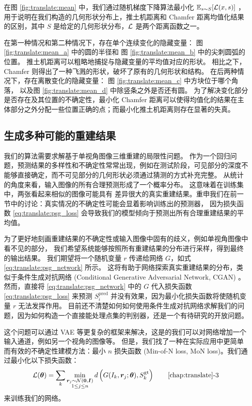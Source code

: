 在图 \ref{fig:translate:mean} 中，我们通过随机梯度下降算法最小化 $\mathbb{E}_{s \sim S} {\left[\mathcal{L}(x, s)\right]}$ ，用于说明在我们构造的几何形状分布上，推土机距离和 Chamfer 距离均值化结果的区别，其中 $S$ 是给定的几何形状分布，$\mathcal{L}$ 是两个距离函数之一。

在第一种情况和第二种情况下，存在单个连续变化的隐藏变量：
图 \ref{fig:translate:mean_a} 中的圆的半径和
图 \ref{fig:translate:mean_b} 中的尖刺圆弧的位置。 推土机距离可以粗略地捕捉与隐藏变量的平均值对应的形状。
相比之下，Chamfer 则得出了一种飞溅的形状，破坏了原有的几何形状和结构。 在后两种情况下，存在离散变化的隐藏变量：
图 \ref{fig:translate:mean_c} 中方块位于哪个角落，
以及图 \ref{fig:translate:mean_d} 中除竖条之外是否还有圆。 为了解决变化部分是否存在及其位置的不确定性，最小化 Chamfer 距离可以使得均值化的结果在主体部分之外分配一些位置正确的点；而最小化推土机距离则存在显著的失真。




\subsection{生成多种可能的重建结果 \label{section:translate:psg_uncertainty}}

我们的算法需要求解基于单视角图像三维重建的局限性问题。
作为一个回归问题，预测结果的多样性和不确定性常常出现，例如在测试阶段，可见部分的深度不能够直接确定，而不可见部分的几何形状必须通过猜测的方式补充完整。
从统计的角度来看，输入图像的所有合理预测形成了一个概率分布。
这意味着在训练集中，两张看起来相似的图像可能具有
差异很大的真实重建结果。重申我们在前一节中的讨论：真实情况的不确定性可能会显着影响训练出的预测器，
因为损失函数 \eqref{eq:translate:psg_loss} 会导致我们的模型倾向于预测出所有合理重建结果的平均值。


为了更好地刻画重建结果的不确定性或输入图像中固有的歧义，例如单视角图像中看不见的部分，
我们希望系统能够按照所有重建结果的分布进行采样，得到最终的输出结果。
我们期望将一个随机变量 $r$ 传递给网络 $G$，如式 \eqref{eq:translate:psg_network} 所示。
这将有助于网络探索真实重建结果的分布，类似于条件生成对抗网络
(Conditional Generative Adversarial Network, CGAN) \acite{[17]}。
然而，直接将 \eqref{eq:translate:psg_network} 中的 $G$ 代入损失函数
\eqref{eq:translate:psg_loss} 来预测 $S_i^{\text{pred}}$
并没有效果，因为最小化损失函数将使随机变量 $r$ 无法发挥作用。
目前还不清楚如何如何使用条件生成对抗网络求解我们的问题，因为如何构造一个直接能处理点集的判别器，还是一个有待研究的开放问题。

这个问题可以通过 VAE 等更复杂的框架来解决，这是的我们可以对网络增加一个输入通道，例如另一个视角的图像等。
但是，我们找了一种在实际应用中更简单而有效的不确定性建模方法：最小 $n$ 损失函数 (Min-of-N loss, MoN loss)。我们通过最小化以下损失函数：
\begin{align}
	\Loss(\bm \theta) = \sum_k
	\min_{\substack{\bm r_j \sim \NormDist(\bm 0, \bm I) \\  1 \le j \le n}}
	d\left(
	{G(I_k, \bm r_j; \bm \theta)    }
	,
	{   S_k^{\text{gt}}   }
	\right)
	\tag*{\ref{chap:translate}-3} \label{eq:translate:psg_mon}
\end{align}
来训练我们的网络。

